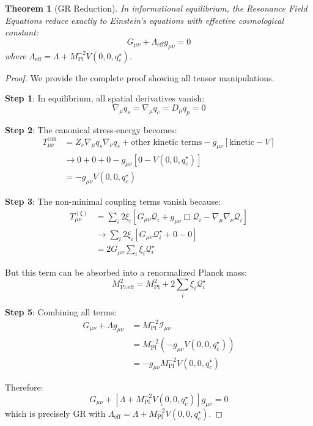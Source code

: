 \documentclass[openany]{memoir}
\theoremstyle{definition}
\theoremstyle{plain}
\newtheorem{theorem}[definition]{Theorem}
\theoremstyle{remark}
\newcommand{\MPl}{M_{\text{Pl}}}
\newcommand{\Tcan}{T^{\text{can}}}
\newcommand{\Txi}{T^{(\xi)}}
\begin{document}
\begin{theorem}[GR Reduction]
In informational equilibrium, the Resonance Field Equations reduce exactly to Einstein's equations with effective cosmological constant:
\begin{equation}
G_{\mu\nu} + \Lambda_{\text{eff}} g_{\mu\nu} = 0
\end{equation}
where $\Lambda_{\text{eff}} = \Lambda + \MPl^{-2} V(0, 0, q_c^\star)$.
\end{theorem}

\begin{proof}
We provide the complete proof showing all tensor manipulations.

\textbf{Step 1}: In equilibrium, all spatial derivatives vanish:
\begin{equation}
\nabla_\mu q_s = \nabla_\mu q_c = D_\mu q_p = 0
\end{equation}

\textbf{Step 2}: The canonical stress-energy becomes:
\begin{align}
\Tcan_{\mu\nu} &= Z_s \nabla_\mu q_s \nabla_\nu q_s + \text{other kinetic terms} - g_{\mu\nu}[\text{kinetic} - V] \\
&\to 0 + 0 + 0 - g_{\mu\nu}[0 - V(0, 0, q_c^\star)] \\
&= -g_{\mu\nu} V(0, 0, q_c^\star)
\end{align}

\textbf{Step 3}: The non-minimal coupling terms vanish because:
\begin{align}
\Txi_{\mu\nu} &= \sum_i 2\xi_i [G_{\mu\nu} \mathcal{Q}_i + g_{\mu\nu} \Box \mathcal{Q}_i - \nabla_\mu \nabla_\nu \mathcal{Q}_i] \\
&\to \sum_i 2\xi_i [G_{\mu\nu} \mathcal{Q}_i^\star + 0 - 0] \\
&= 2G_{\mu\nu} \sum_i \xi_i \mathcal{Q}_i^\star
\end{align}

But this term can be absorbed into a renormalized Planck mass:
\begin{equation}
M_{\text{Pl,eff}}^2 = M_{\text{Pl}}^2 + 2\sum_i \xi_i \mathcal{Q}_i^\star
\end{equation}

\textbf{Step 5}: Combining all terms:
\begin{align}
G_{\mu\nu} + \Lambda g_{\mu\nu} &= \MPl^{-2} \mathcal{I}_{\mu\nu} \\
&= \MPl^{-2} (-g_{\mu\nu} V(0, 0, q_c^\star)) \\
&= -g_{\mu\nu} \MPl^{-2} V(0, 0, q_c^\star)
\end{align}

Therefore:
\begin{equation}
G_{\mu\nu} + [\Lambda + \MPl^{-2} V(0, 0, q_c^\star)] g_{\mu\nu} = 0
\end{equation}
which is precisely GR with $\Lambda_{\text{eff}} = \Lambda + \MPl^{-2} V(0, 0, q_c^\star)$.
\end{proof}
\end{document}
